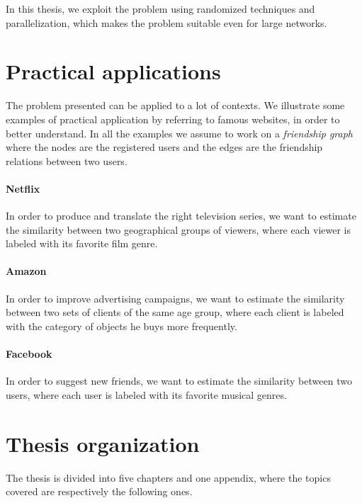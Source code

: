In this thesis, we exploit the problem using randomized techniques and parallelization, which makes the problem suitable even for large networks. 

\section{Practical applications}

The problem presented can be applied to a lot of contexts. 
We illustrate some examples of practical application by referring to famous websites,
in order to better understand.
In all the examples we assume to work on a \textit{friendship graph} where the nodes are the registered users and 
the edges are the friendship relations between two users.

\paragraph*{Netflix} In order to produce and translate the right television series, we want to estimate the similarity between two geographical groups of viewers, where each viewer is labeled with its favorite film genre.

\paragraph*{Amazon} In order to improve advertising campaigns, we want to estimate the similarity between two sets of clients of the same age group, where each client is labeled with the category of objects he buys more frequently.

\paragraph*{Facebook} In order to suggest new friends, we want to estimate the similarity between two users, where each user is labeled with its favorite musical genres.  

\clearpage

\section{Thesis organization}

The thesis is divided into five chapters and one appendix, where
the topics covered are respectively the following ones.\medskip

